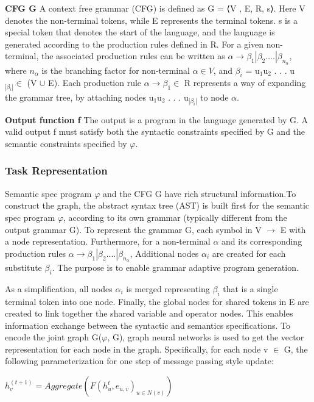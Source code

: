 \documentclass{article}
\begin{document}
\textbf{CFG G} A context free grammar (CFG) is defined as G = ⟨V , E, R, s⟩. Here V denotes the non-terminal tokens, while E represents the terminal tokens. s is a special token that denotes the start of the language, and the language is generated according to the production rules defined in R. For a given non-terminal, the associated production rules can be written as $\alpha \rightarrow \beta_1 | \beta_2 .... | \beta_{n_\alpha}$, where ${n_\alpha}$ is the branching factor for non-terminal $\alpha \in V$, and $\beta _i$ = u$_1$u$_2$ . . . u$_{|\beta_i|} \in$  (V $\cup$ E). Each production rule $\alpha \rightarrow \beta_1 \in$ R represents a way of expanding the grammar tree, by attaching nodes u$_1$u$_2$ . . . u$_{|\beta_i|}$ to node $\alpha$.

\textbf{Output function f} The output is a program in the language generated by G. A valid output f must satisfy both the syntactic constraints specified by G and the semantic constraints specified by $\varphi$.
\subsubsection{Task Representation}
Semantic spec program $\varphi$ and the CFG G have rich structural information.To construct the graph, the abstract syntax tree (AST) is built first for the semantic spec program $\varphi$, according to its own grammar (typically different from the output grammar G). To represent the grammar G, each symbol in V $\rightarrow$ E with a node representation. Furthermore, for a non-terminal $\alpha$ and its corresponding production rules  $\alpha \rightarrow \beta_1 | \beta_2 .... | \beta_{n_\alpha}$, Additional nodes $\alpha_i$  are created for each substitute $\beta_i$. The purpose is to enable grammar adaptive program generation.

As a simplification, all nodes $\alpha_i$ is merged representing $\beta_i$ that is a single terminal token into one node. Finally, the global nodes for shared tokens in E are created to link together the shared variable and operator nodes. This enables information exchange between the syntactic and semantics specifications. To encode the joint graph G($\varphi$, G), graph neural networks is used to get the vector representation for each node in the graph. Specifically, for each node v $\in$ G, the following parameterization for one step of message passing style update:

\begin{math}
h^{(t+1)}_v = Aggregate({F(h^t_u , e_{u,v} )}_{u \in N(v)})
\end{math}
\end{document}
